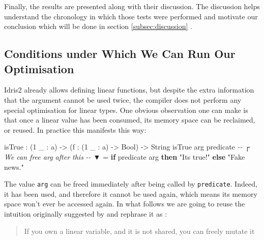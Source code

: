\documentclass[
]{article}
\newenvironment{Shaded}{}{}
\newcommand{\CommentTok}[1]{\textcolor[rgb]{0.38,0.63,0.69}{\textit{#1}}}
\newcommand{\DataTypeTok}[1]{\textcolor[rgb]{0.56,0.13,0.00}{#1}}
\newcommand{\DecValTok}[1]{\textcolor[rgb]{0.25,0.63,0.44}{#1}}
\newcommand{\KeywordTok}[1]{\textcolor[rgb]{0.00,0.44,0.13}{\textbf{#1}}}
\newcommand{\NormalTok}[1]{#1}
\newcommand{\OperatorTok}[1]{\textcolor[rgb]{0.40,0.40,0.40}{#1}}
\newcommand{\OtherTok}[1]{\textcolor[rgb]{0.00,0.44,0.13}{#1}}
\newcommand{\StringTok}[1]{\textcolor[rgb]{0.25,0.44,0.63}{#1}}
\begin{document}
Finally, the results are presented along with their discussion. The
discussion helps understand the chronology in which those tests were
performed and motivate our conclusion which will be done in section
\ref{subsec:discussion} .

\hypertarget{conditions-under-which-we-can-run-our-optimisation}{%
\subsection{Conditions under Which We Can Run Our
Optimisation}\label{conditions-under-which-we-can-run-our-optimisation}}

Idris2 already allows defining linear functions, but despite the extra
information that the argument cannot be used twice, the compiler does
not perform any special optimisation for linear types. One obvious
observation one can make is that once a linear value has been consumed,
its memory space can be reclaimed, or reused. In practice this manifests
this way:

\begin{Shaded}
\begin{Highlighting}[]
\NormalTok{isTrue }\OperatorTok{:}\NormalTok{ (}\DecValTok{1}\NormalTok{ \_ }\OperatorTok{:}\NormalTok{ a) }\OtherTok{{-}\textgreater{}}\NormalTok{ (f }\OperatorTok{:}\NormalTok{ (}\DecValTok{1}\NormalTok{ \_ }\OperatorTok{:}\NormalTok{ a) }\OtherTok{{-}\textgreater{}} \DataTypeTok{Bool}\NormalTok{) }\OtherTok{{-}\textgreater{}} \DataTypeTok{String}
\NormalTok{isTrue arg predicate}
\CommentTok{{-}{-}                ┌ We can free \textasciigrave{}arg\textasciigrave{} after this}
\CommentTok{{-}{-}                ▼}
  \OtherTok{=} \KeywordTok{if}\NormalTok{ predicate arg }\KeywordTok{then} \StringTok{"It\textquotesingle{}s true!"}
                     \KeywordTok{else} \StringTok{"Fake news."}
\end{Highlighting}
\end{Shaded}

The value \texttt{arg} can be freed immediately after being called by
\texttt{predicate}. Indeed, it has been used, and therefore it cannot be
used again, which means its memory space won't ever be accessed again.
In what follows we are going to reuse the intuition originally suggested
by \cite{once_upon_a_type}\cite{linear_types_update}\cite{linear_use}
and rephrase it as :

\begin{quote}
If you own a linear variable, and it is not shared, you can freely
mutate it
\end{quote}
\end{document}
